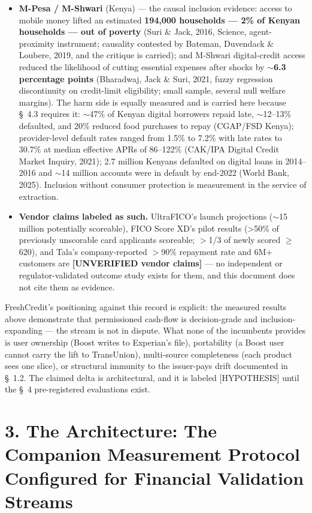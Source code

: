 \documentclass[11pt,twocolumn]{article}
\begin{document}
\begin{itemize}
\item \textbf{M-Pesa / M-Shwari} (Kenya) --- the causal inclusion evidence: access to mobile money lifted an estimated \textbf{194,000 households --- 2\% of Kenyan households --- out of poverty} (Suri \& Jack, 2016, Science, agent-proximity instrument; causality contested by Bateman, Duvendack \& Loubere, 2019, and the critique is carried); and M-Shwari digital-credit access reduced the likelihood of cutting essential expenses after shocks by \textbf{$\sim$6.3 percentage points} (Bharadwaj, Jack \& Suri, 2021, fuzzy regression discontinuity on credit-limit eligibility; small sample, several null welfare margins). The harm side is equally measured and is carried here because \S~4.3 requires it: $\sim$47\% of Kenyan digital borrowers repaid late, $\sim$12--13\% defaulted, and 20\% reduced food purchases to repay (CGAP/FSD Kenya); provider-level default rates ranged from 1.5\% to 7.2\% with late rates to 30.7\% at median effective APRs of 86--122\% (CAK/IPA Digital Credit Market Inquiry, 2021); 2.7 million Kenyans defaulted on digital loans in 2014--2016 and $\sim$14 million accounts were in default by end-2022 (World Bank, 2025). Inclusion without consumer protection is measurement in the service of extraction.
\item \textbf{Vendor claims labeled as such.} UltraFICO's launch projections ($\sim$15 million potentially scoreable), FICO Score XD's pilot results (>50\% of previously unscorable card applicants scoreable; $>$1/3 of newly scored $\geq$620), and Tala's company-reported $>$90\% repayment rate and 6M+ customers are \textbf{[UNVERIFIED vendor claims]} --- no independent or regulator-validated outcome study exists for them, and this document does not cite them as evidence.
\end{itemize}

FreshCredit's positioning against this record is explicit: the measured results above demonstrate that permissioned cash-flow is decision-grade and inclusion-expanding --- the stream is not in dispute. What none of the incumbents provides is user ownership (Boost writes to Experian's file), portability (a Boost user cannot carry the lift to TransUnion), multi-source completeness (each product sees one slice), or structural immunity to the issuer-pays drift documented in \S~1.2. The claimed delta is architectural, and it is labeled [HYPOTHESIS] until the \S~4 pre-registered evaluations exist.

\section*{3. The Architecture: The Companion Measurement Protocol Configured for Financial Validation Streams}
\end{document}
